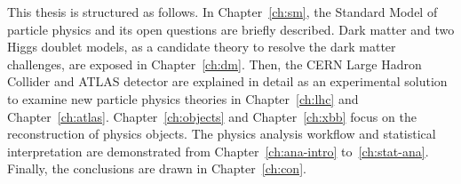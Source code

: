 \par This thesis is structured as follows. 
In Chapter~\ref{ch:sm}, the Standard Model of particle physics and its open questions are briefly described. Dark matter and two Higgs doublet models, as a candidate theory to resolve the dark matter challenges, are exposed in Chapter~\ref{ch:dm}. 
Then, the CERN Large Hadron Collider and ATLAS detector are explained in detail as an experimental solution to examine new particle physics theories in Chapter~\ref{ch:lhc} and Chapter~\ref{ch:atlas}. Chapter~\ref{ch:objects} and Chapter~\ref{ch:xbb} focus on the reconstruction of physics objects.
The physics analysis workflow and statistical interpretation are demonstrated from Chapter~\ref{ch:ana-intro} to~\ref{ch:stat-ana}. Finally, the conclusions are drawn in Chapter~\ref{ch:con}.
